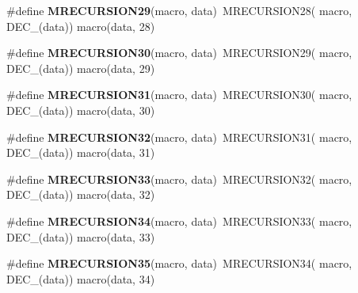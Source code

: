 \begin{DoxyCompactItemize}
\item 
\hypertarget{group__group__sam0__utils__mrecursion_ga08a713aa50ee68cfce7a4c6ace95b062}{}\#define {\bfseries M\+R\+E\+C\+U\+R\+S\+I\+O\+N29}(macro,  data)~M\+R\+E\+C\+U\+R\+S\+I\+O\+N28(  macro, D\+E\+C\+\_\+(data))   macro(data, 28)\label{group__group__sam0__utils__mrecursion_ga08a713aa50ee68cfce7a4c6ace95b062}

\item 
\hypertarget{group__group__sam0__utils__mrecursion_ga2de673fe7e4b0c99a0e48aa8f0885d30}{}\#define {\bfseries M\+R\+E\+C\+U\+R\+S\+I\+O\+N30}(macro,  data)~M\+R\+E\+C\+U\+R\+S\+I\+O\+N29(  macro, D\+E\+C\+\_\+(data))   macro(data, 29)\label{group__group__sam0__utils__mrecursion_ga2de673fe7e4b0c99a0e48aa8f0885d30}

\item 
\hypertarget{group__group__sam0__utils__mrecursion_ga75814302d0a93ce9b7ee446c5e734d71}{}\#define {\bfseries M\+R\+E\+C\+U\+R\+S\+I\+O\+N31}(macro,  data)~M\+R\+E\+C\+U\+R\+S\+I\+O\+N30(  macro, D\+E\+C\+\_\+(data))   macro(data, 30)\label{group__group__sam0__utils__mrecursion_ga75814302d0a93ce9b7ee446c5e734d71}

\item 
\hypertarget{group__group__sam0__utils__mrecursion_gac43f3446adca956aebe694bac78623eb}{}\#define {\bfseries M\+R\+E\+C\+U\+R\+S\+I\+O\+N32}(macro,  data)~M\+R\+E\+C\+U\+R\+S\+I\+O\+N31(  macro, D\+E\+C\+\_\+(data))   macro(data, 31)\label{group__group__sam0__utils__mrecursion_gac43f3446adca956aebe694bac78623eb}

\item 
\hypertarget{group__group__sam0__utils__mrecursion_ga69b9fe1f38b856bfbce8006cecfb7ab6}{}\#define {\bfseries M\+R\+E\+C\+U\+R\+S\+I\+O\+N33}(macro,  data)~M\+R\+E\+C\+U\+R\+S\+I\+O\+N32(  macro, D\+E\+C\+\_\+(data))   macro(data, 32)\label{group__group__sam0__utils__mrecursion_ga69b9fe1f38b856bfbce8006cecfb7ab6}

\item 
\hypertarget{group__group__sam0__utils__mrecursion_ga36973b26fc7f9e90f40c6667a2f2c85c}{}\#define {\bfseries M\+R\+E\+C\+U\+R\+S\+I\+O\+N34}(macro,  data)~M\+R\+E\+C\+U\+R\+S\+I\+O\+N33(  macro, D\+E\+C\+\_\+(data))   macro(data, 33)\label{group__group__sam0__utils__mrecursion_ga36973b26fc7f9e90f40c6667a2f2c85c}

\item 
\hypertarget{group__group__sam0__utils__mrecursion_gabb6594c5157f3ae6651cce3ec53ec922}{}\#define {\bfseries M\+R\+E\+C\+U\+R\+S\+I\+O\+N35}(macro,  data)~M\+R\+E\+C\+U\+R\+S\+I\+O\+N34(  macro, D\+E\+C\+\_\+(data))   macro(data, 34)\label{group__group__sam0__utils__mrecursion_gabb6594c5157f3ae6651cce3ec53ec922}


\end{DoxyCompactItemize}
